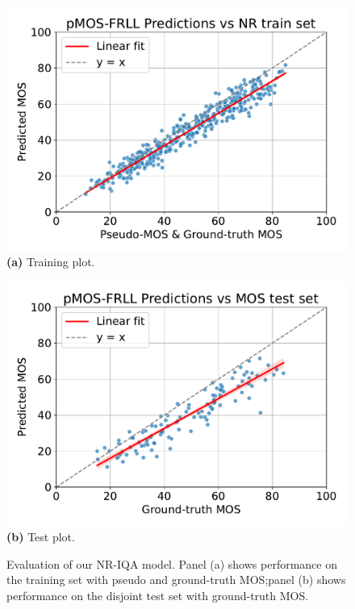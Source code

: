 \begin{figure}[ht]
    \centering
    \begin{minipage}[t]{0.48\textwidth}
        \centering
        \includegraphics[width=\linewidth]{images/predictions_train.pdf}
        \textbf{(a)} Training plot.\@
    \end{minipage}
        \hfill
        \begin{minipage}[t]{0.48\textwidth}
        \centering
        \includegraphics[width=\linewidth]{images/predictions_test.pdf}
        \textbf{(b)} Test plot.\@
    \end{minipage}
    \caption{Evaluation of our NR-IQA model. Panel (a) shows performance on the training set with pseudo and ground-truth MOS;\@ panel (b) shows performance on the disjoint test set with ground-truth MOS.}\label{fig:nr-iqa-metric}
\end{figure}

